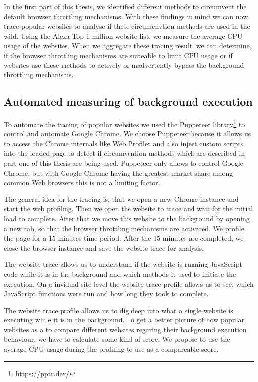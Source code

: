 \documentclass[article,type=bsc,colorback,accentcolor=tud9c]{tudthesis}
\begin{document}
  In the first part of this thesis, we identified different methods to circumvent the default browser throttling mechanisms. With these findings in mind we can now trace popular websites to analyse if these circumenvtion methods are used in the wild. Using the Alexa Top 1 million website list, we measure the average CPU usage of the websites. When we aggregate these tracing result, we can determine, if the browser throttling mechanisms are suiteable to limit CPU usage or if websites use these methods to actively or inadvertently bypass the background throttling mechanisms.
  
  \subsection{Automated measuring of background execution}

  To automate the tracing of popular websites we used the Puppeteer library\footnote{\url{https://pptr.dev/}} to control and automate Google Chrome. We choose Puppeteer because it allows us to access the Chrome internals like Web Profiler and also inject custom scripts into the loaded page to detect if circumvention methods which are described in part one of this thesis are being used. Puppeteer only allows to control Google Chrome, but with Google Chrome having the greatest market share among common Web browsers this is not a limiting factor.

  The general idea for the tracing is, that we open a new Chrome instance and start the web profiling. Then we open the website to trace and wait for the initial load to complete. After that we move this website to the background by opening a new tab, so that the browser throttling mechanisms are activated. We profile the page for a 15 minutes time period. After the 15 minutes are completed, we close the browser instance and save the website trace for analysis.

  The website trace allows us to understand if the website is running JavaScript code while it is in the background and which methods it used to initiate the execution. On a invidual site level the website trace profile allows us to see, which JavaScript functions were run and how long they took to complete.

  The website trace profile allows us to dig deep into what a single website is executing while it is in the background. To get a better picture of how popular websites as a  to compare different websites regaring their background execution behaviour, we have to calculate some kind of score. We propose to use the average CPU usage during the profiling to use as a compareable score. 
\end{document}
